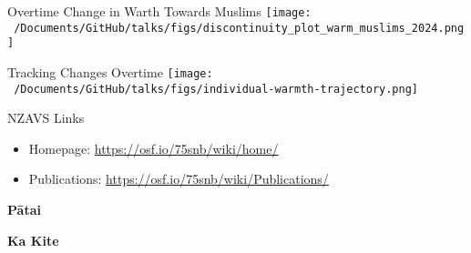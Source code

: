 \documentclass[
  ignorenonframetext,
  aspectratio=169,
]{beamer}
\providecommand{\tightlist}{%
  \setlength{\itemsep}{0pt}\setlength{\parskip}{0pt}}\usepackage{longtable,booktabs,array}
\begin{document}
\begin{frame}{Overtime Change in Warth Towards Muslims}
\label{overtime-change-in-warth-towards-muslims}
\texttt{[image: ~/Documents/GitHub/talks/figs/discontinuity\_plot\_warm\_muslims\_2024.png]}
\end{frame}

\begin{frame}{Tracking Changes Overtime}
\label{tracking-changes-overtime}
\texttt{[image: ~/Documents/GitHub/talks/figs/individual-warmth-trajectory.png]}
\end{frame}

\begin{frame}{NZAVS Links}
\label{nzavs-links}
\begin{itemize}
\tightlist
\item
  Homepage: \url{https://osf.io/75snb/wiki/home/}
\item
  Publications: \url{https://osf.io/75snb/wiki/Publications/}
\end{itemize}
\end{frame}

\begin{frame}
\textbf{Pātai}
\end{frame}

\begin{frame}
\textbf{Ka Kite}
\end{frame}
\end{document}
